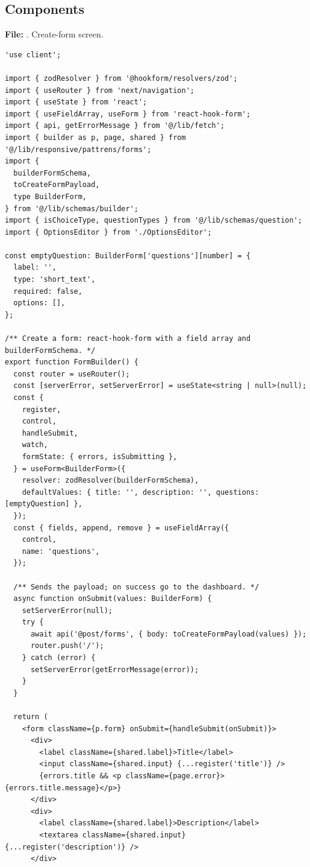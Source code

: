 \documentclass[11pt,a4paper]{article}
\begin{document}
\subsection{Components}
\textbf{File:} . Create-form screen.\par
\begin{lstlisting}
'use client';

import { zodResolver } from '@hookform/resolvers/zod';
import { useRouter } from 'next/navigation';
import { useState } from 'react';
import { useFieldArray, useForm } from 'react-hook-form';
import { api, getErrorMessage } from '@/lib/fetch';
import { builder as p, page, shared } from '@/lib/responsive/pattrens/forms';
import {
  builderFormSchema,
  toCreateFormPayload,
  type BuilderForm,
} from '@/lib/schemas/builder';
import { isChoiceType, questionTypes } from '@/lib/schemas/question';
import { OptionsEditor } from './OptionsEditor';

const emptyQuestion: BuilderForm['questions'][number] = {
  label: '',
  type: 'short_text',
  required: false,
  options: [],
};

/** Create a form: react-hook-form with a field array and builderFormSchema. */
export function FormBuilder() {
  const router = useRouter();
  const [serverError, setServerError] = useState<string | null>(null);
  const {
    register,
    control,
    handleSubmit,
    watch,
    formState: { errors, isSubmitting },
  } = useForm<BuilderForm>({
    resolver: zodResolver(builderFormSchema),
    defaultValues: { title: '', description: '', questions: [emptyQuestion] },
  });
  const { fields, append, remove } = useFieldArray({
    control,
    name: 'questions',
  });

  /** Sends the payload; on success go to the dashboard. */
  async function onSubmit(values: BuilderForm) {
    setServerError(null);
    try {
      await api('@post/forms', { body: toCreateFormPayload(values) });
      router.push('/');
    } catch (error) {
      setServerError(getErrorMessage(error));
    }
  }

  return (
    <form className={p.form} onSubmit={handleSubmit(onSubmit)}>
      <div>
        <label className={shared.label}>Title</label>
        <input className={shared.input} {...register('title')} />
        {errors.title && <p className={page.error}>{errors.title.message}</p>}
      </div>
      <div>
        <label className={shared.label}>Description</label>
        <textarea className={shared.input} {...register('description')} />
      </div>


\end{lstlisting}
\end{document}
